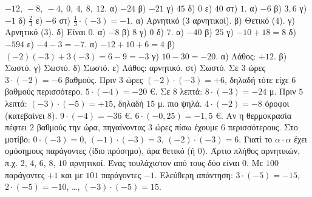  $-12,\ -8,\ -4,\ 0,\ 4,\ 8,\ 12$.
 α) $-24$ \quad β) $-21$ \quad γ) $45$ \quad δ) $0$ \quad ε) $40$ \quad στ) $1$.
 α) $-6$ \quad β) $3{,}6$ \quad γ) $-1$ \quad δ) $\frac{2}{3}$ \quad ε) $-6$ \quad στ) $\frac{1}{3}\cdot(-3)=-1$.
 α) Αρνητικό ($3$ αρνητικοί). β) Θετικό ($4$). γ) Αρνητικό ($3$). δ) Είναι $0$.
 α) $-8$ \quad β) $8$ \quad γ) $0$ \quad δ) $7$.
 α) $-40$ \quad β) $25$ \quad γ) $-10+18=8$ \quad δ) $-594$ \quad ε) $-4-3=-7$.
 α) $-12+10+6=4$ \quad β) $(-2)(-3)+3(-3)=6-9=-3$ \quad γ) $10-30=-20$.
 α) Λάθος: $+12$. β) Σωστό. γ) Σωστό. δ) Σωστό. ε) Λάθος: αρνητικό. στ) Σωστό.
 Σε $3$ ώρες $3\cdot(-2)=-6$ βαθμούς. Πριν $3$ ώρες $(-2)\cdot(-3)=+6$, δηλαδή τότε είχε $6$ βαθμούς περισσότερο.
 $5\cdot(-4)=-20$ €.
 Σε $8$ λεπτά: $8\cdot(-3)=-24$ μ. Πριν $5$ λεπτά: $(-3)\cdot(-5)=+15$, δηλαδή $15$ μ. πιο ψηλά.
 $4\cdot(-2)=-8$ όροφοι (κατεβαίνει $8$).
 $9\cdot(-4)=-36$ €.
 $6\cdot(-0{,}25)=-1{,}5$ €.
 Αν η θερμοκρασία πέφτει $2$ βαθμούς την ώρα, πηγαίνοντας $3$ ώρες πίσω έχουμε $6$ περισσότερους. Στο μοτίβο: $0\cdot(-3)=0$, $(-1)\cdot(-3)=3$, $(-2)\cdot(-3)=6$.
 Γιατί το $\alpha\cdot\alpha$ έχει ομόσημους παράγοντες (ίδιο πρόσημο), άρα θετικό (ή $0$).
 Άρτιο πλήθος αρνητικών, π.χ. $2$, $4$, $6$, $8$, $10$ αρνητικοί.
 Ένας τουλάχιστον από τους δύο είναι $0$.
 Με $100$ παράγοντες $+1$ και με $101$ παράγοντες $-1$.
 Ελεύθερη απάντηση: $3\cdot(-5)=-15$, $2\cdot(-5)=-10$, \dots, $(-3)\cdot(-5)=15$.
